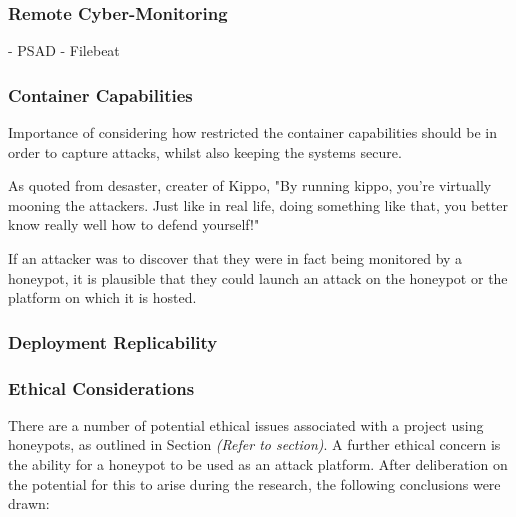 		\subsubsection{Remote Cyber-Monitoring}
		- PSAD
		- Filebeat

		\subsubsection{Container Capabilities}
		Importance of considering how restricted the container capabilities should be in order to capture attacks, whilst also keeping the systems secure.
		
		As quoted from desaster, creater of Kippo, "By running kippo, you're virtually mooning the attackers. Just like in real life, doing something like that, you better know really well how to defend yourself!"
		
		If an attacker was to discover that they were in fact being monitored by a honeypot, it is plausible that they could launch an attack on the honeypot or the platform on which it is hosted.

		\subsubsection{Deployment Replicability}
		
		\subsubsection{Ethical Considerations}
		There are a number of potential ethical issues associated with a project using honeypots, as outlined in Section \textit{(Refer to section)}. A further ethical concern is the ability for a honeypot to be used as an attack platform. After deliberation on the potential for this to arise during the research, the following conclusions were drawn: 	
		
